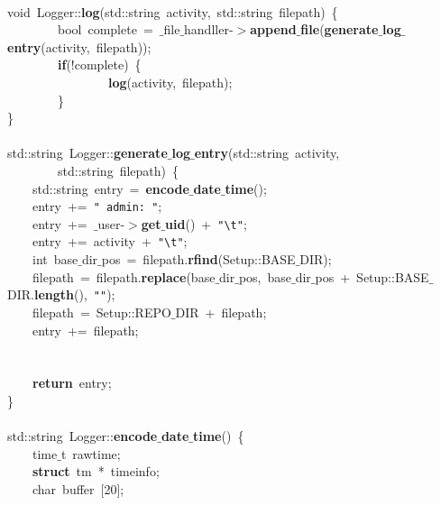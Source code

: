 \mbox{} \\
\mbox{}void\ Logger::\textbf{log}(std::string\ activity,\ std::string\ filepath)\ \{ \\
\mbox{}\ \ \ \ \ \ \ \ bool\ complete\ =\ $\_$file$\_$handller-$>$\textbf{append$\_$file}(\textbf{generate$\_$log$\_$entry}(activity,\ filepath)); \\
\mbox{}\ \ \ \ \ \ \ \ \textbf{if}(!complete)\ \{ \\
\mbox{}\ \ \ \ \ \ \ \ \ \ \ \ \ \ \ \ \textbf{log}(activity,\ filepath); \\
\mbox{}\ \ \ \ \ \ \ \ \} \\
\mbox{}\} \\
\mbox{} \\
\mbox{}std::string\ Logger::\textbf{generate$\_$log$\_$entry}(std::string\ activity, \\
\mbox{}\ \ \ \ \ \ \ \ std::string\ filepath)\ \{ \\
\mbox{}\ \ \ \ std::string\ entry\ =\ \textbf{encode$\_$date$\_$time}(); \\
\mbox{}\ \ \ \ entry\ +=\ \texttt{"{}\ admin:\ "{}}; \\
\mbox{}\ \ \ \ entry\ +=\ $\_$user-$>$\textbf{get$\_$uid}()\ +\ \texttt{"{}}\texttt{\textbackslash{}t}\texttt{"{}}; \\
\mbox{}\ \ \ \ entry\ +=\ activity\ +\ \texttt{"{}}\texttt{\textbackslash{}t}\texttt{"{}}; \\
\mbox{}\ \ \ \ int\ base$\_$dir$\_$pos\ =\ filepath.\textbf{rfind}(Setup::BASE$\_$DIR); \\
\mbox{}\ \ \ \ filepath\ =\ filepath.\textbf{replace}(base$\_$dir$\_$pos,\ base$\_$dir$\_$pos\ +\ Setup::BASE$\_$DIR.\textbf{length}(),\ \texttt{"{}"{}}); \\
\mbox{}\ \ \ \ filepath\ =\ Setup::REPO$\_$DIR\ +\ filepath; \\
\mbox{}\ \ \ \ entry\ +=\ filepath; \\
\mbox{} \\
\mbox{} \\
\mbox{}\ \ \ \ \textbf{return}\ entry; \\
\mbox{}\} \\
\mbox{} \\
\mbox{}std::string\ Logger::\textbf{encode$\_$date$\_$time}()\ \{ \\
\mbox{}\ \ \ \ time$\_$t\ rawtime; \\
\mbox{}\ \ \ \ \textbf{struct}\ tm\ *\ timeinfo; \\
\mbox{}\ \ \ \ char\ buffer\ [20]; \\

